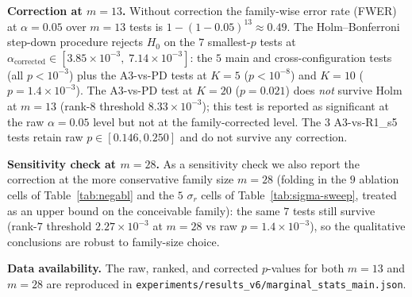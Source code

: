 \documentclass[11pt,onecolumn,a4paper]{article}
\begin{document}
\begin{appendices}
\textbf{Correction at $m = 13$.}
Without correction the family-wise error rate (FWER) at
$\alpha = 0.05$ over $m = 13$ tests is
$1 - (1 - 0.05)^{13} \approx 0.49$.
The Holm--Bonferroni step-down procedure rejects $H_0$ on the
$7$ smallest-$p$ tests at
$\alpha_{\text{corrected}} \in [3.85\times 10^{-3},\;
7.14\times 10^{-3}]$:
the $5$ main and cross-configuration tests (all $p < 10^{-3}$)
plus the A3-vs-PD tests at $K = 5$ ($p < 10^{-8}$) and $K = 10$
($p = 1.4\times 10^{-3}$).
The A3-vs-PD test at $K = 20$ ($p = 0.021$) does \emph{not} survive
Holm at $m = 13$ (rank-$8$ threshold
$8.33\times 10^{-3}$); this test is reported as significant at the
raw $\alpha = 0.05$ level but not at the family-corrected level.
The $3$ A3-vs-R1\_s5 tests retain raw
$p \in [0.146, 0.250]$ and do not survive any correction.

\textbf{Sensitivity check at $m = 28$.}
As a sensitivity check we also report the correction at the more
conservative family size $m = 28$ (folding in the $9$ ablation cells
of Table~\ref{tab:negabl} and the $5$ $\sigma_r$ cells of
Table~\ref{tab:sigma-sweep}, treated as an upper bound on the
conceivable family): the same $7$ tests still survive (rank-$7$
threshold $2.27\times 10^{-3}$ at $m = 28$ vs raw
$p = 1.4\times 10^{-3}$), so the qualitative conclusions are robust
to family-size choice.

\textbf{Data availability.}
The raw, ranked, and corrected $p$-values for both $m = 13$ and
$m = 28$ are reproduced in
\texttt{experiments/results\_v6/marginal\_stats\_main.json}.

\end{appendices}
\end{document}
